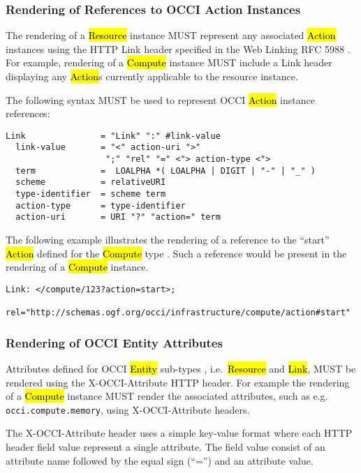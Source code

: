\documentclass[10pt,a4paper]{article}
\begin{document}
\subsubsection{Rendering of References to OCCI Action Instances}
The rendering of a \hl{Resource} instance \cite{occi:core} MUST
represent any associated \hl{Action} instances using the HTTP Link
header specified in the Web Linking RFC 5988 \cite{rfc5988}.  For
example, rendering of a \hl{Compute} instance MUST include a Link
header displaying any \hl{Action}s currently applicable to the
resource instance.

The following syntax MUST be used to represent OCCI \hl{Action}
instance references:

\begin{verbatim}
Link               = "Link" ":" #link-value
  link-value       = "<" action-uri ">"
                    ";" "rel" "=" <"> action-type <">
  term             =  LOALPHA *( LOALPHA | DIGIT | "-" | "_" )
  scheme           = relativeURI
  type-identifier  = scheme term
  action-type      = type-identifier
  action-uri       = URI "?" "action=" term
\end{verbatim}

The following example illustrates the rendering of a reference to the
``start'' \hl{Action} defined for the \hl{Compute} type
\cite{occi:infrastructure}. Such a reference would be present in the
rendering of a \hl{Compute} instance.

\begin{verbatim}
Link: </compute/123?action=start>;
    rel="http://schemas.ogf.org/occi/infrastructure/compute/action#start"
\end{verbatim}

\subsubsection{Rendering of OCCI Entity Attributes}
Attributes defined for OCCI \hl{Entity} sub-types \cite{occi:core},
i.e.~\hl{Resource} and \hl{Link}, MUST be rendered using the
X-OCCI-Attribute HTTP header. For example the rendering of a
\hl{Compute} instance MUST render the associated attributes, such as
e.g. \texttt{occi.compute.memory}, using X-OCCI-Attribute headers.

The X-OCCI-Attribute header uses a simple key-value format where each
HTTP header field value represent a single attribute. The field value
consist of an attribute name followed by the equal sign (``='') and an
attribute value.
\end{document}
